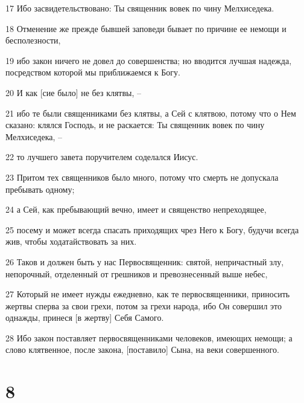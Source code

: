 \par 17 Ибо засвидетельствовано: Ты священник вовек по чину Мелхиседека.
\par 18 Отменение же прежде бывшей заповеди бывает по причине ее немощи и бесполезности,
\par 19 ибо закон ничего не довел до совершенства; но вводится лучшая надежда, посредством которой мы приближаемся к Богу.
\par 20 И как [сие было] не без клятвы, --
\par 21 ибо те были священниками без клятвы, а Сей с клятвою, потому что о Нем сказано: клялся Господь, и не раскается: Ты священник вовек по чину Мелхиседека, --
\par 22 то лучшего завета поручителем соделался Иисус.
\par 23 Притом тех священников было много, потому что смерть не допускала пребывать одному;
\par 24 а Сей, как пребывающий вечно, имеет и священство непреходящее,
\par 25 посему и может всегда спасать приходящих чрез Него к Богу, будучи всегда жив, чтобы ходатайствовать за них.
\par 26 Таков и должен быть у нас Первосвященник: святой, непричастный злу, непорочный, отделенный от грешников и превознесенный выше небес,
\par 27 Который не имеет нужды ежедневно, как те первосвященники, приносить жертвы сперва за свои грехи, потом за грехи народа, ибо Он совершил это однажды, принеся [в жертву] Себя Самого.
\par 28 Ибо закон поставляет первосвященниками человеков, имеющих немощи; а слово клятвенное, после закона, [поставило] Сына, на веки совершенного.

\chapter{8}

